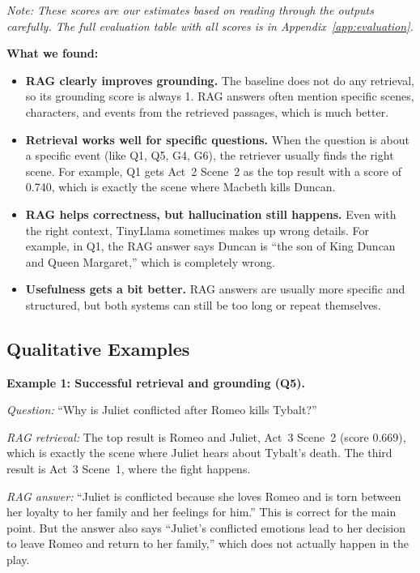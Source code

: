 \documentclass[10pt,conference]{IEEEtran}
\begin{document}
\textit{Note: These scores are our estimates based on reading through the outputs carefully. The full evaluation table with all scores is in Appendix~\ref{app:evaluation}.}

\textbf{What we found:}

\begin{itemize}
    \item \textbf{RAG clearly improves grounding.} The baseline does not do any retrieval, so its grounding score is always 1. RAG answers often mention specific scenes, characters, and events from the retrieved passages, which is much better.
    \item \textbf{Retrieval works well for specific questions.} When the question is about a specific event (like Q1, Q5, G4, G6), the retriever usually finds the right scene. For example, Q1 gets Act~2 Scene~2 as the top result with a score of 0.740, which is exactly the scene where Macbeth kills Duncan.
    \item \textbf{RAG helps correctness, but hallucination still happens.} Even with the right context, TinyLlama sometimes makes up wrong details. For example, in Q1, the RAG answer says Duncan is ``the son of King Duncan and Queen Margaret,'' which is completely wrong.
    \item \textbf{Usefulness gets a bit better.} RAG answers are usually more specific and structured, but both systems can still be too long or repeat themselves.
\end{itemize}

\subsection{Qualitative Examples}

\textbf{Example 1: Successful retrieval and grounding (Q5).}

\textit{Question:} ``Why is Juliet conflicted after Romeo kills Tybalt?''

\textit{RAG retrieval:} The top result is Romeo and Juliet, Act~3 Scene~2 (score 0.669), which is exactly the scene where Juliet hears about Tybalt's death. The third result is Act~3 Scene~1, where the fight happens.

\textit{RAG answer:} ``Juliet is conflicted because she loves Romeo and is torn between her loyalty to her family and her feelings for him.'' This is correct for the main point. But the answer also says ``Juliet's conflicted emotions lead to her decision to leave Romeo and return to her family,'' which does not actually happen in the play.
\end{document}
